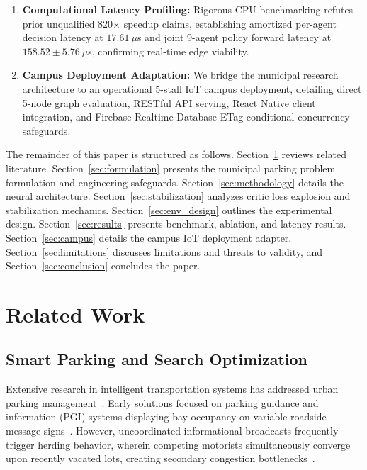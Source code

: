 \documentclass[journal]{IEEEtran}
\begin{document}
\begin{enumerate}
    \item \textbf{Computational Latency Profiling:} Rigorous CPU benchmarking refutes prior unqualified 820$\times$ speedup claims, establishing amortized per-agent decision latency at $17.61~\mu$s and joint 9-agent policy forward latency at $158.52 \pm 5.76~\mu$s, confirming real-time edge viability.
    \item \textbf{Campus Deployment Adaptation:} We bridge the municipal research architecture to an operational 5-stall IoT campus deployment, detailing direct 5-node graph evaluation, RESTful API serving, React Native client integration, and Firebase Realtime Database ETag conditional concurrency safeguards.
\end{enumerate}

The remainder of this paper is structured as follows. Section~\ref{sec:related_work} reviews related literature. Section~\ref{sec:formulation} presents the municipal parking problem formulation and engineering safeguards. Section~\ref{sec:methodology} details the neural architecture. Section~\ref{sec:stabilization} analyzes critic loss explosion and stabilization mechanics. Section~\ref{sec:env_design} outlines the experimental design. Section~\ref{sec:results} presents benchmark, ablation, and latency results. Section~\ref{sec:campus} details the campus IoT deployment adapter. Section~\ref{sec:limitations} discusses limitations and threats to validity, and Section~\ref{sec:conclusion} concludes the paper.

\section{Related Work}
\label{sec:related_work}

\subsection{Smart Parking and Search Optimization}
Extensive research in intelligent transportation systems has addressed urban parking management~\cite{lin2017survey,inci2015review}. Early solutions focused on parking guidance and information (PGI) systems displaying bay occupancy on variable roadside message signs~\cite{vlahogianni2016real}. However, uncoordinated informational broadcasts frequently trigger herding behavior, wherein competing motorists simultaneously converge upon recently vacated lots, creating secondary congestion bottlenecks~\cite{arnott2006economic}. 
\end{document}
